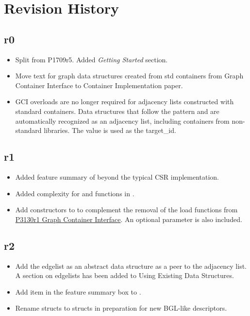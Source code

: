 \section{Revision History}

\subsection*{\paperno r0}

\begin{itemize}
      \item Split from P1709r5. Added \textit{Getting Started} section.
      \item Move text for graph data structures created from std containers from Graph Container Interface to 
            Container Implementation paper.
      \item GCI overloads are no longer required for adjacency lists constructed with standard containers. Data structures that follow
            the pattern  and 
            are automatically recognized as an adjacency list, including containers from non-standard libraries. The 
            value is used as the target\_id.
\end{itemize}

\subsection*{\paperno r1}
\begin{itemize}
      \item Added feature summary of  beyond the typical CSR implementation.
      \item Added complexity for  and  functions in .
      \item Add constructors to  to complement the removal of the load functions from 
            \href{https://www.wg21.link/P3130r1}{P3130r1 Graph Container Interface}. An optional  
            parameter is also included.
\end{itemize}

\subsection*{\paperno r2}

\begin{itemize}
      \item Add the edgelist as an abstract data structure as a peer to the adjacency list. 
            A section on edgelists has been added to Using Existing Data Structures.
      \item Add  item in the feature summary box to .
      \item Rename  structs to  structs in preparation for new BGL-like descriptors.
\end{itemize}

